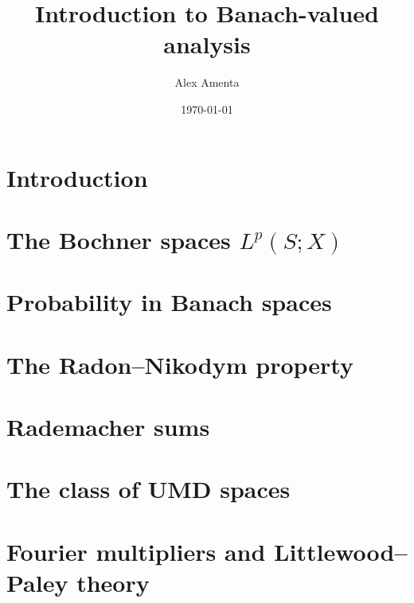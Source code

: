 \documentclass[a4paper,10pt,intlimits,sumlimits]{amsbook}
\begin{document}
\title[Banach-valued analysis]{Introduction to Banach-valued analysis}
\date{\today}

\author[A. Amenta]{Alex Amenta}
\address{\noindent Mathematisches Institut \newline \indent Universit\"at Bonn, Bonn, Germany}

\maketitle
\tableofcontents

\chapter{Introduction}
\label{sec:intro}


\chapter{The Bochner spaces \texorpdfstring{$L^p(S;X)$}{Lp(S;X)}}
\label{sec:Bochner-spaces}


\chapter{Probability in Banach spaces}
\label{sec:martingales} 


\chapter{The Radon--Nikodym property}
\label{sec:RNP}


\chapter{Rademacher sums}
\label{sec:rademacher}


\chapter{The class of UMD spaces}
\label{sec:UMD}


\chapter{Fourier multipliers and Littlewood--Paley theory}
\label{sec:HT}

\end{document}

